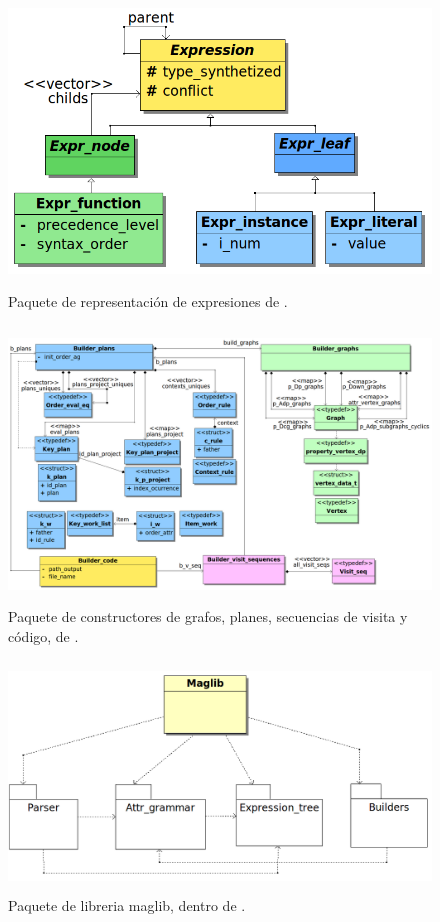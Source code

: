 \begin{figure}[!ht]\centering
\includegraphics[width=350pt, height=219pt]{diagramas/Expression2.png}
\caption{\label{fig:dia-express}Paquete de representación de expresiones de \maggen.}
\end{figure}

\begin{figure}[!ht]\centering
\includegraphics[width=350pt, height=208pt]{diagramas/Builder.png}
\caption{\label{fig:dia-builders}Paquete de constructores de grafos, planes, secuencias de visita y código, de \maggen.}
\end{figure}

\begin{figure}[!ht]\centering
\includegraphics[width=350pt, height=173pt]{diagramas/maggen.png}
\caption{\label{fig:dia-maglib}Paquete de libreria maglib, dentro de \maggen.}
\end{figure}

